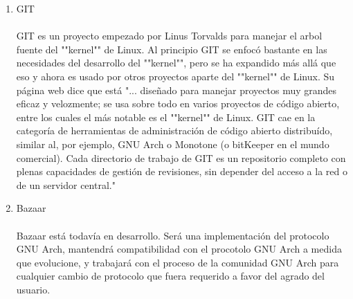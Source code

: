 \begin{enumerate}[1.]
	\item GIT
	\\
	\\GIT es un proyecto empezado por Linus Torvalds para manejar el arbol fuente del ""kernel"" de Linux. Al principio GIT se enfocó bastante en las necesidades del desarrollo del ""kernel"", pero se ha expandido más allá que eso y ahora es usado por otros proyectos aparte del ""kernel"" de Linux. Su página web dice que está "... diseñado para manejar proyectos muy grandes eficaz y velozmente; se usa sobre todo en varios proyectos de código abierto, entre los cuales el más notable es el ""kernel"" de Linux. GIT cae en la categoría de herramientas de administración de código abierto distribuído, similar al, por ejemplo, GNU Arch o Monotone (o bitKeeper en el mundo comercial). Cada directorio de trabajo de GIT es un repositorio completo con plenas capacidades de gestión de revisiones, sin depender del acceso a la red o de un servidor central."

	\item Bazaar
	\\
	\\Bazaar está todavía en desarrollo. Será una implementación del protocolo GNU Arch, mantendrá compatibilidad con el procotolo GNU Arch a medida que evolucione, y trabajará con el proceso de la comunidad GNU Arch para cualquier cambio de protocolo que fuera requerido a favor del agrado del usuario.

\end{enumerate}

